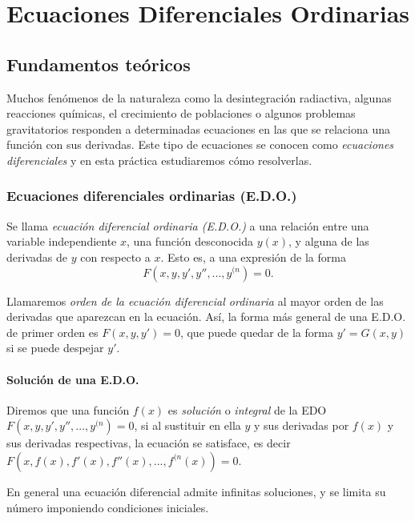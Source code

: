 
\chapter{Ecuaciones Diferenciales Ordinarias}

\section{Fundamentos teóricos}

Muchos fenómenos de la naturaleza como la desintegración radiactiva,
algunas reacciones químicas, el crecimiento de poblaciones o algunos
problemas gravitatorios responden a determinadas ecuaciones en las
que se relaciona una función con sus derivadas. Este tipo de
ecuaciones se conocen como \emph{ecuaciones diferenciales} y en esta
práctica estudiaremos cómo resolverlas.

\subsection{Ecuaciones diferenciales ordinarias (E.D.O.)}

Se llama \emph{ecuación diferencial ordinaria (E.D.O.)} a una relación entre
una variable independiente $x$, una función desconocida $y(x)$, y alguna de
las derivadas de $y$ con respecto a $x$. Esto es, a una expresión de la forma
\[
F(x,y,y',y'',...,y^{(n})=0.
\]

Llamaremos \emph{orden de la ecuación diferencial ordinaria} al mayor orden de las derivadas que aparezcan en la ecuación. Así, la forma más general de una E.D.O. de primer orden es $F(x,y,y')=0$, que puede quedar de la forma $y'=G(x,y)$ si se puede despejar $y'$.

\subsubsection*{Solución de una E.D.O.}

Diremos que una función $f(x)$ es \emph{solución} o \emph{integral} de la EDO $F(x,y,y',y'',...,y^{(n})=0$, si al sustituir en ella $y$ y sus derivadas por $f(x)$ y sus derivadas respectivas, la ecuación se satisface, es decir $F(x,f(x),f'(x),f''(x),...,f^{(n}(x))=0$.

En general una ecuación diferencial admite infinitas soluciones, y se limita su número imponiendo condiciones iniciales.

